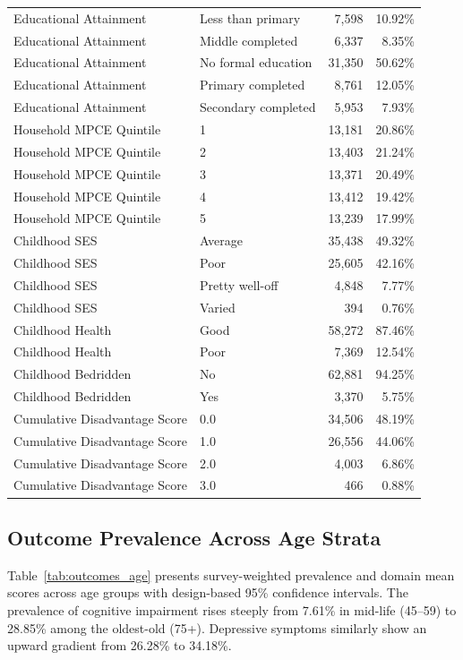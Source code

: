 \documentclass[11pt,a4paper]{article}
\begin{document}
\begin{table}[H]
\begin{tabular}{llrr}
Educational Attainment & Less than primary & 7,598 & 10.92\% \\
Educational Attainment & Middle completed & 6,337 & 8.35\% \\
Educational Attainment & No formal education & 31,350 & 50.62\% \\
Educational Attainment & Primary completed & 8,761 & 12.05\% \\
Educational Attainment & Secondary completed & 5,953 & 7.93\% \\
Household MPCE Quintile & 1 & 13,181 & 20.86\% \\
Household MPCE Quintile & 2 & 13,403 & 21.24\% \\
Household MPCE Quintile & 3 & 13,371 & 20.49\% \\
Household MPCE Quintile & 4 & 13,412 & 19.42\% \\
Household MPCE Quintile & 5 & 13,239 & 17.99\% \\
Childhood SES & Average & 35,438 & 49.32\% \\
Childhood SES & Poor & 25,605 & 42.16\% \\
Childhood SES & Pretty well-off & 4,848 & 7.77\% \\
Childhood SES & Varied & 394 & 0.76\% \\
Childhood Health & Good & 58,272 & 87.46\% \\
Childhood Health & Poor & 7,369 & 12.54\% \\
Childhood Bedridden & No & 62,881 & 94.25\% \\
Childhood Bedridden & Yes & 3,370 & 5.75\% \\
Cumulative Disadvantage Score & 0.0 & 34,506 & 48.19\% \\
Cumulative Disadvantage Score & 1.0 & 26,556 & 44.06\% \\
Cumulative Disadvantage Score & 2.0 & 4,003 & 6.86\% \\
Cumulative Disadvantage Score & 3.0 & 466 & 0.88\% \\
\bottomrule
\end{tabular}
\end{table}

\subsection{Outcome Prevalence Across Age Strata}
Table~\ref{tab:outcomes_age} presents survey-weighted prevalence and domain mean scores across age groups with design-based 95\% confidence intervals. The prevalence of cognitive impairment rises steeply from 7.61\% in mid-life (45--59) to 28.85\% among the oldest-old (75+). Depressive symptoms similarly show an upward gradient from 26.28\% to 34.18\%.
\end{document}
